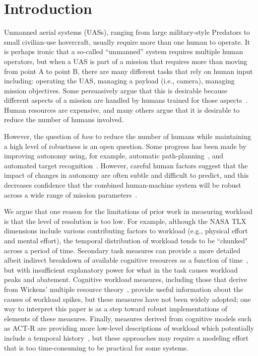 \section{Introduction}

Unmanned aerial systems (UASs), ranging from large military-style Predators to small civilian-use hovercraft, usually require more than one human to operate.  It is perhaps ironic that a so-called ``unmanned'' system requires multiple human operators, but when a UAS is part of a mission that requires more than moving from point A to point B, there are many different tasks that rely on human input including: operating the UAS, managing a payload (i.e., camera), managing mission objectives.  Some persuasively argue that this is desirable because different aspects of a mission are handled by humans trained for those aspects~\cite{MurphyBurke2010}. Human resources are expensive, and many others argue that it is desirable to reduce the number of humans involved.

However, the question of {\em how} to reduce the number of humans while maintaining a high level of robustness is an open question.  Some progress has been made by improving autonomy using, for example, automatic path-planning~\cite{WongBourgaultFurukawa2005,878915,pettersson2006probabilistic,QuigleyBarberEtAl2005,NelsonBarberMcLainBeard2006}, and automated target recognition~\cite{MorseEnghGoodrich2010,dasgupta2008multiagent,barber2006vision}.  However, careful human factors suggest that the impact of changes in autonomy are often subtle and difficult to predict, and this decreases confidence that the combined human-machine system will be robust across a wide range of mission parameters~\cite{KaberEndsley2004,chen2011supervisory,chen2007human}.

We argue that one reason for the limitations of prior work in measuring workload is that the level of resolution is too low.  For example, although the NASA TLX dimensions include various contributing factors to workload (e.g., physical effort and mental effort), the temporal distribution of workload tends to be ``chunked" across a period of time.  Secondary task measures can provide a more detailed albeit indirect breakdown of available cognitive resources as a function of time~\cite{kaber1999adaptive}, but with insufficient explanatory power for what in the task causes workload peaks and abatement.  Cognitive workload measures, including those that derive from Wickens' multiple resource theory~\cite{wickens2002multiple}, provide useful information about the causes of workload spikes, but these measures have not been widely adopted; one way to interpret this paper is as a step toward robust implementations of elements of these measures.  Finally, measures derived from cognitive models such as ACT-R are providing more low-level descriptions of workload which potentially include a temporal history~\cite{lebiere2013cognitive}, but these approaches may require a modeling effort that is too time-consuming to be practical for some systems.

